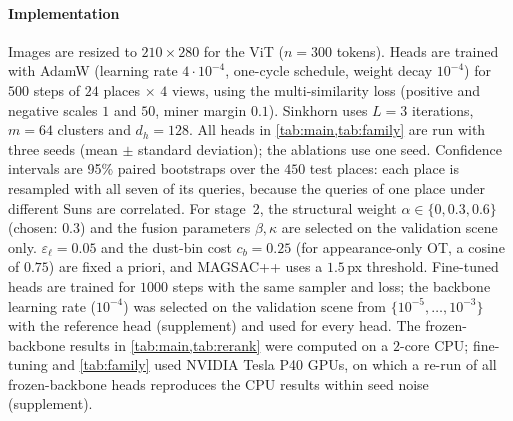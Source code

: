 \paragraph*{Implementation}
Images are resized to $210\times280$ for the ViT ($n=300$ tokens). Heads are trained with AdamW
(learning rate $4\cdot10^{-4}$, one-cycle schedule, weight decay $10^{-4}$) for $500$ steps of $24$
places $\times$ $4$ views, using the multi-similarity loss (positive and negative scales $1$ and $50$,
miner margin $0.1$). Sinkhorn uses $L=3$ iterations, $m=64$ clusters and $d_h=128$. All heads in \cref{tab:main,tab:family}
are run with three seeds (mean $\pm$ standard deviation); the ablations use one
seed. Confidence intervals are 95\% paired bootstraps over the $450$ test places: each place is resampled
with all seven of its queries, because the queries of one place under different Suns are correlated. For stage~2, the structural weight $\alpha\in\{0,0.3,0.6\}$ (chosen: $0.3$) and the fusion
parameters $\beta,\kappa$ are selected on the validation scene only. $\varepsilon_\ell=0.05$ and the
dust-bin cost $c_b=0.25$ (for appearance-only OT, a cosine of $0.75$) are fixed a priori, and MAGSAC++ uses a $1.5$\,px threshold.
Fine-tuned heads are trained for $1000$ steps with the same sampler and loss; the backbone learning
rate ($10^{-4}$) was selected on the validation scene from $\{10^{-5},\dots,10^{-3}\}$ with the reference
head (supplement) and used for every head. The frozen-backbone results in \cref{tab:main,tab:rerank}
were computed on a $2$-core CPU; fine-tuning and \cref{tab:family} used NVIDIA Tesla P40 GPUs, on which
a re-run of all frozen-backbone heads reproduces the CPU results within seed noise (supplement).
